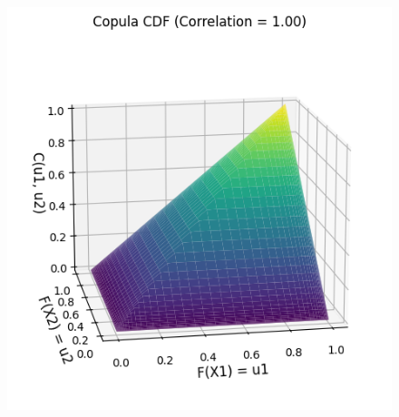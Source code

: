 \begin{example}

\end{example}
    

\begin{figure}
    \centering
    \begin{minipage}{0.45\textwidth}
        \centering
        \includegraphics[width=\textwidth]{3Theory/pictures/TrueCopula.png}
        \label{fig:TrueCopulaExponential}
    \end{minipage}
    \hfill
    \begin{minipage}{0.45\textwidth}
        \centering

\end{minipage}
\end{figure}
